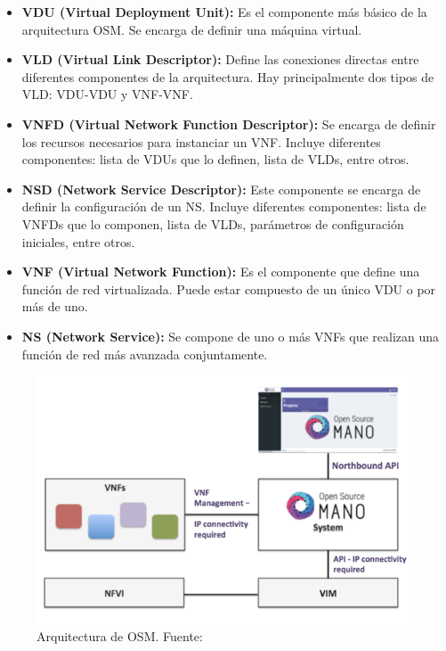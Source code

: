 \begin{itemize}
	\item \textbf{VDU (Virtual Deployment Unit):} Es el componente más básico de la arquitectura OSM. Se encarga de definir una máquina virtual. 
	
	\item \textbf{VLD (Virtual Link Descriptor):} Define las conexiones directas entre diferentes componentes de la arquitectura. Hay principalmente dos tipos de VLD: VDU-VDU y VNF-VNF.
	
	\item \textbf{VNFD (Virtual Network Function Descriptor):} Se encarga de definir los recursos necesarios para instanciar un VNF. Incluye diferentes componentes: lista de VDUs que lo definen, lista de VLDs, entre otros.
	
	\item \textbf{NSD (Network Service Descriptor):} Este componente se encarga de definir la configuración de un NS. Incluye diferentes componentes: lista de VNFDs que lo componen, lista de VLDs, parámetros de configuración iniciales, entre otros.
	
	\item \textbf{VNF (Virtual Network Function):} Es el componente que define una función de red virtualizada. Puede estar compuesto de un único VDU o por más de uno.
	
	\item \textbf{NS (Network Service):} Se compone de uno o más VNFs que realizan una función de red más avanzada conjuntamente.
\end{itemize}

\clearpage

\begin{figure}[!ht]
	\centering
	\includegraphics[width=0.8\linewidth]{imagenes/osm_arch}
	\caption{Arquitectura de OSM. 
		Fuente: \cite{osmwikibib}}
	\label{fig:osmarch}
\end{figure}

